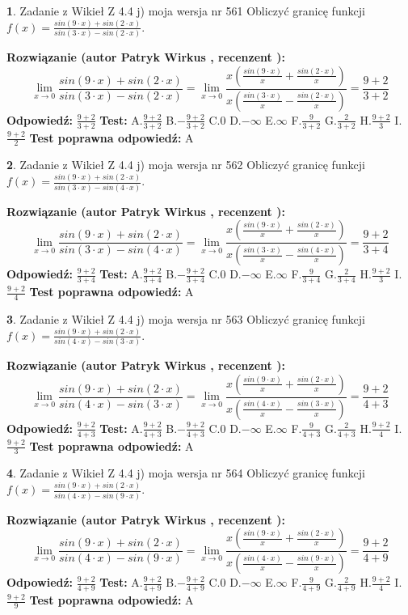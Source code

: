 \documentclass[12pt, a4paper]{article}
\theoremstyle{definition} %
\newtheorem{zad}{}
\newcommand{\zadStart}[1]{\begin{zad}#1\newline}
\newcommand{\zadStop}{\end{zad}}
\newcommand{\rozwStart}[2]{\noindent \textbf{Rozwiązanie (autor #1 , recenzent #2): }\newline}
\newcommand{\rozwStop}{\newline}
\newcommand{\odpStart}{\noindent \textbf{Odpowiedź:}\newline}
\newcommand{\odpStop}{\newline}
\newcommand{\testStart}{\noindent \textbf{Test:}\newline}
\newcommand{\testStop}{\newline}
\newcommand{\kluczStart}{\noindent \textbf{Test poprawna odpowiedź:}\newline}
\newcommand{\kluczStop}{\newline}
\begin{document}
\zadStart{Zadanie z Wikieł Z 4.4 j) moja wersja nr 561}
Obliczyć granicę funkcji $f(x)=\frac{sin(9\cdot x) +sin(2\cdot x)}{sin(3\cdot x) -sin(2\cdot x)}$.
\zadStop
\rozwStart{Patryk Wirkus}{}
$$\lim\limits_{x\to 0}\frac{sin(9\cdot x) +sin(2\cdot x)}{sin(3\cdot x) -sin(2\cdot x)}=\lim\limits_{x\to 0}\frac{x(\frac{sin(9\cdot x)}{x}+\frac{sin(2\cdot x)}{x})}{x(\frac{sin(3\cdot x)}{x}-\frac{sin(2\cdot x)}{x})}=\frac{9+2}{3+2}$$
\rozwStop
\odpStart
$\frac{9+2}{3+2}$
\odpStop
\testStart
A.$\frac{9+2}{3+2}$
B.$-\frac{9+2}{3+2}$
C.$0$
D.$-\infty$
E.$\infty$
F.$\frac{9}{3+2}$
G.$\frac{2}{3+2}$
H.$\frac{9+2}{3}$
I.$\frac{9+2}{2}$
\testStop
\kluczStart
A
\kluczStop



\zadStart{Zadanie z Wikieł Z 4.4 j) moja wersja nr 562}
Obliczyć granicę funkcji $f(x)=\frac{sin(9\cdot x) +sin(2\cdot x)}{sin(3\cdot x) -sin(4\cdot x)}$.
\zadStop
\rozwStart{Patryk Wirkus}{}
$$\lim\limits_{x\to 0}\frac{sin(9\cdot x) +sin(2\cdot x)}{sin(3\cdot x) -sin(4\cdot x)}=\lim\limits_{x\to 0}\frac{x(\frac{sin(9\cdot x)}{x}+\frac{sin(2\cdot x)}{x})}{x(\frac{sin(3\cdot x)}{x}-\frac{sin(4\cdot x)}{x})}=\frac{9+2}{3+4}$$
\rozwStop
\odpStart
$\frac{9+2}{3+4}$
\odpStop
\testStart
A.$\frac{9+2}{3+4}$
B.$-\frac{9+2}{3+4}$
C.$0$
D.$-\infty$
E.$\infty$
F.$\frac{9}{3+4}$
G.$\frac{2}{3+4}$
H.$\frac{9+2}{3}$
I.$\frac{9+2}{4}$
\testStop
\kluczStart
A
\kluczStop



\zadStart{Zadanie z Wikieł Z 4.4 j) moja wersja nr 563}
Obliczyć granicę funkcji $f(x)=\frac{sin(9\cdot x) +sin(2\cdot x)}{sin(4\cdot x) -sin(3\cdot x)}$.
\zadStop
\rozwStart{Patryk Wirkus}{}
$$\lim\limits_{x\to 0}\frac{sin(9\cdot x) +sin(2\cdot x)}{sin(4\cdot x) -sin(3\cdot x)}=\lim\limits_{x\to 0}\frac{x(\frac{sin(9\cdot x)}{x}+\frac{sin(2\cdot x)}{x})}{x(\frac{sin(4\cdot x)}{x}-\frac{sin(3\cdot x)}{x})}=\frac{9+2}{4+3}$$
\rozwStop
\odpStart
$\frac{9+2}{4+3}$
\odpStop
\testStart
A.$\frac{9+2}{4+3}$
B.$-\frac{9+2}{4+3}$
C.$0$
D.$-\infty$
E.$\infty$
F.$\frac{9}{4+3}$
G.$\frac{2}{4+3}$
H.$\frac{9+2}{4}$
I.$\frac{9+2}{3}$
\testStop
\kluczStart
A
\kluczStop



\zadStart{Zadanie z Wikieł Z 4.4 j) moja wersja nr 564}
Obliczyć granicę funkcji $f(x)=\frac{sin(9\cdot x) +sin(2\cdot x)}{sin(4\cdot x) -sin(9\cdot x)}$.
\zadStop
\rozwStart{Patryk Wirkus}{}
$$\lim\limits_{x\to 0}\frac{sin(9\cdot x) +sin(2\cdot x)}{sin(4\cdot x) -sin(9\cdot x)}=\lim\limits_{x\to 0}\frac{x(\frac{sin(9\cdot x)}{x}+\frac{sin(2\cdot x)}{x})}{x(\frac{sin(4\cdot x)}{x}-\frac{sin(9\cdot x)}{x})}=\frac{9+2}{4+9}$$
\rozwStop
\odpStart
$\frac{9+2}{4+9}$
\odpStop
\testStart
A.$\frac{9+2}{4+9}$
B.$-\frac{9+2}{4+9}$
C.$0$
D.$-\infty$
E.$\infty$
F.$\frac{9}{4+9}$
G.$\frac{2}{4+9}$
H.$\frac{9+2}{4}$
I.$\frac{9+2}{9}$
\testStop
\kluczStart
A
\kluczStop
\end{document}
